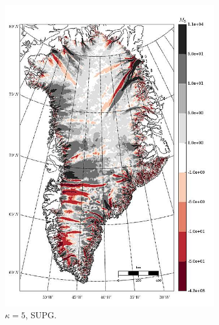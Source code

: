 \begin{figure}
\begin{subfigure}[b]{0.25\linewidth}
    \includegraphics[width=\linewidth]{images/balance_velocity/greenland/d_U_ob/misfit_5H_kappa_5_SUPG.jpg}
  \caption{$\kappa = 5$, SUPG.}
  \label{greenland_bv_image_d_U_ob_kappa_5_SUPG_misfit}
  \end{subfigure}
  \begin{subfigure}[b]{0.25\linewidth}

\end{subfigure}
\end{figure}
